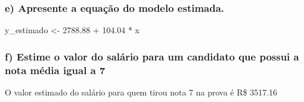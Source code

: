 \documentclass[
]{article}
\begin{document}
\hypertarget{e-apresente-a-equauxe7uxe3o-do-modelo-estimada.}{%
\subsubsection{e) Apresente a equação do modelo
estimada.}\label{e-apresente-a-equauxe7uxe3o-do-modelo-estimada.}}

y\_estimado \textless- 2788.88 + 104.04 * x

\hypertarget{f-estime-o-valor-do-saluxe1rio-para-um-candidato-que-possui-a-nota-muxe9dia-igual-a-7}{%
\subsubsection{f) Estime o valor do salário para um candidato que possui
a nota média igual a
7}\label{f-estime-o-valor-do-saluxe1rio-para-um-candidato-que-possui-a-nota-muxe9dia-igual-a-7}}

O valor estimado do salário para quem tirou nota 7 na prova é R\$
3517.16
\end{document}
